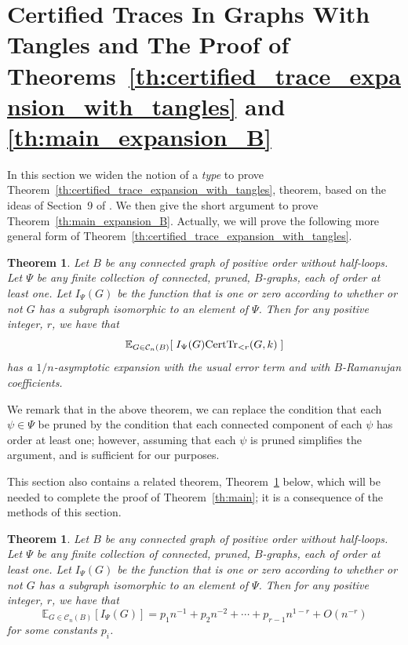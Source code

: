 \documentclass{memo-l}
\theoremstyle{plain}
\theoremstyle{definition}
\numberwithin{section}{chapter}
\numberwithin{equation}{chapter}
\newcommand{\expect}[2]{{\mathbb{E}}_{#1}{\left[\; #2\; \right]}}
\theoremstyle{plain}
\newtheorem{thm}[theorem]{Theorem}
\theoremstyle{definition}
\newcommand\EE{\mathbb{E}}
\newcommand\cC{\mathcal{C}}
\begin{document}
\section[Certified Traces With Tangles;
Proofs of Theorems~\ref{th:certified_trace_expansion_with_tangles}
and \ref{th:main_expansion_B}]{
Certified Traces In Graphs With Tangles and 
The Proof of Theorems~\ref{th:certified_trace_expansion_with_tangles}
and \ref{th:main_expansion_B}
}
\label{se:p1-with-tangles}

%
%
%
%

In this section we widen the notion of a \emph{type} to prove 
Theorem~\ref{th:certified_trace_expansion_with_tangles},
theorem, based on the ideas of Section~9 of \cite{friedman_alon}.  
We then give the short argument to
prove Theorem~\ref{th:main_expansion_B}.
Actually, we will prove the following more general form
of Theorem~\ref{th:certified_trace_expansion_with_tangles}.

\begin{thm} \label{th:with_without} 
Let $B$ be any connected graph of positive order without half-loops.
Let \( \Psi \) be any 
finite collection of 
connected, pruned, \( B \)-graphs, each of order at least one.
Let \( I_\Psi(G) \) be the function that is one or
zero according to whether or not \( G \) has a subgraph isomorphic to an
element of \( \Psi \).  Then for any positive integer, $r$, we have that
$$
\expect{G\in\cC_n(B)}{I_\Psi(G) {\rm CertTr}_{<r}(G,k) }
$$
has a $1/n$-asymptotic expansion with the usual error term and with
$B$-Ramanujan coefficients.
\end{thm}

We remark that in the above theorem, we can replace the condition that
each $\psi\in\Psi$ be pruned by the condition that each 
connected component of each $\psi$ has order at least one;
however, assuming that each $\psi$ is pruned simplifies the argument,
and is sufficient for our purposes.

This section also contains a related theorem,
Theorem~\ref{th:no_walks} below, which will be needed
to complete the proof of 
Theorem~\ref{th:main};
it is a consequence of the methods of this section.


\begin{thm}\label{th:no_walks} 
Let $B$ be any connected graph of positive order without half-loops.
Let \( \Psi \) be any 
finite collection of 
connected, pruned, \( B \)-graphs, each of order at least one.
Let \( I_\Psi(G) \) be the function that is one or
zero according to whether or not \( G \) has a subgraph isomorphic to an
element of \( \Psi \).  Then for any positive integer, $r$, we have that
$$
\EE_{G\in\cC_n(B)}[I_\Psi(G)] = 
p_1 n^{-1} + p_2 n^{-2} + \cdots + p_{r-1}n^{1-r} +
O(n^{-r}) 
$$
for some constants \( p_i \).  
\end{thm}
\end{document}
